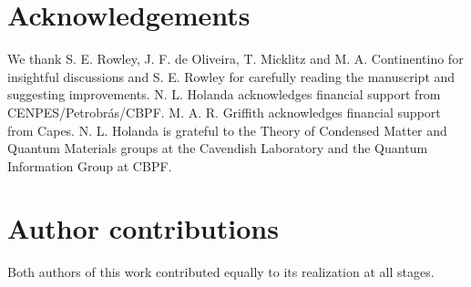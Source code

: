 \documentclass[10pt]{revtex4-1}
\begin{document}


{}

\section*{Acknowledgements}

We thank S. E. Rowley, J. F. de Oliveira, T. Micklitz and M. A. Continentino for insightful discussions and S. E. Rowley for carefully reading the manuscript and suggesting improvements. N. L. Holanda acknowledges financial support from CENPES/Petrobr\'as/CBPF. M. A. R. Griffith acknowledges financial support from Capes. N. L. Holanda is grateful to the Theory of Condensed Matter and Quantum Materials groups at the Cavendish Laboratory and the Quantum Information Group at CBPF.


\section*{Author contributions}

Both authors of this work contributed equally to its realization at all stages.
\end{document}
